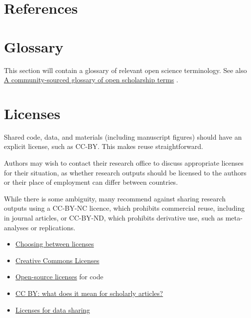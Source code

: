 \documentclass[
  oneside]{book}
\providecommand{\tightlist}{%
  \setlength{\itemsep}{0pt}\setlength{\parskip}{0pt}}
\newlength{\cslhangindent}
\newlength{\cslentryspacingunit} %
\newenvironment{CSLReferences}[2] %
 {%
  \setlength{\parindent}{0pt}
  \ifodd #1
  \let\oldpar\par
  \def\par{\hangindent=\cslhangindent\oldpar}
  \fi
  \setlength{\parskip}{#2\cslentryspacingunit}
 }%
 {}
\begin{document}
\hypertarget{appendix-appendices}{%
\appendix}


\hypertarget{references}{%
\chapter*{References}\label{references}}

\hypertarget{refs}{}
\begin{CSLReferences}{0}{0}
\end{CSLReferences}

\hypertarget{glossary}{%
\chapter{Glossary}\label{glossary}}

This section will contain a glossary of relevant open science terminology. See also \href{https://doi.org/10.1038/s41562-021-01269-4}{A community-sourced glossary of open scholarship terms} \citep{parsons2022community}.

\hypertarget{licenses}{%
\chapter{Licenses}\label{licenses}}

Shared code, data, and materials (including manuscript figures) should have an explicit license, such as CC-BY. This makes reuse straightforward.

Authors may wish to contact their research office to discuss appropriate licenses for their situation, as whether research outputs should be licensed to the authors or their place of employment can differ between countries.

While there is some ambiguity, many recommend against sharing research outputs using a CC-BY-NC licence, which prohibits commercial reuse, including in journal articles, or CC-BY-ND, which prohibits derivative use, such as meta-analyses or replications.

\begin{itemize}
\tightlist
\item
  \href{http://blog.psyarxiv.com/2018/05/14/licensing-work-psyarxiv/}{Choosing between licenses}
\item
  \href{https://creativecommons.org}{Creative Commons Licenses}
\item
  \href{https://opensource.org/licenses}{Open-source licenses} for code
\item
  \href{https://openaccess.ox.ac.uk/2013/06/13/cc-by-what-does-it-mean-for-scholarly-articles-3/}{CC BY: what does it mean for scholarly articles?}
\item
  \href{https://www.ucl.ac.uk/library/research-support/research-data-management/licenses-data-sharing-creative-commons}{Licenses for data sharing}
\end{itemize}
\end{document}
